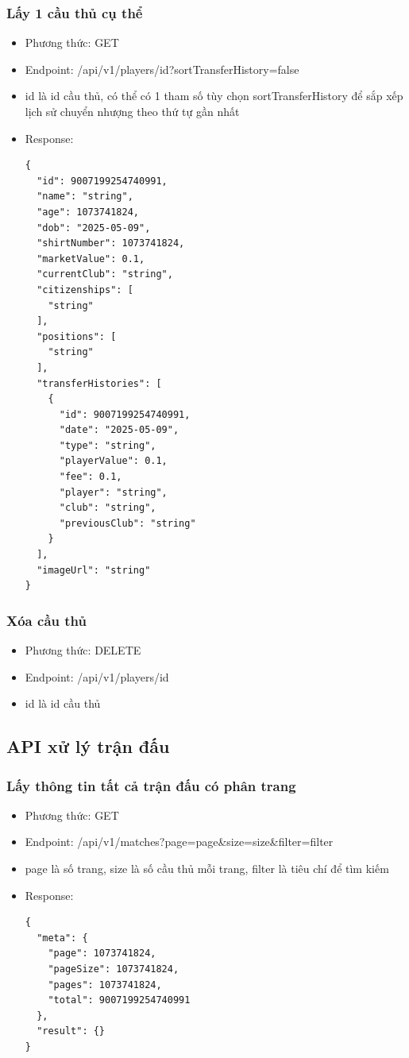\documentclass[../BTL.tex]{subfiles}
\begin{document}
\subsubsection{ Lấy 1 cầu thủ cụ thể}
\begin{itemize}
    \item Phương thức: GET
    \item Endpoint: /api/v1/players/{id}?sortTransferHistory=false
    \item {id} là id cầu thủ, có thể có 1 tham số tùy chọn sortTransferHistory để sắp xếp lịch sử chuyển nhượng theo thứ tự gần nhất
    \item Response:
        \begin{verbatim}          
{
  "id": 9007199254740991,
  "name": "string",
  "age": 1073741824,
  "dob": "2025-05-09",
  "shirtNumber": 1073741824,
  "marketValue": 0.1,
  "currentClub": "string",
  "citizenships": [
    "string"
  ],
  "positions": [
    "string"
  ],
  "transferHistories": [
    {
      "id": 9007199254740991,
      "date": "2025-05-09",
      "type": "string",
      "playerValue": 0.1,
      "fee": 0.1,
      "player": "string",
      "club": "string",
      "previousClub": "string"
    }
  ],
  "imageUrl": "string"
}
        \end{verbatim}
\end{itemize}
\subsubsection{ Xóa cầu thủ}
\begin{itemize}
    \item Phương thức: DELETE
    \item Endpoint: /api/v1/players/{id}
    \item {id} là id cầu thủ
\end{itemize}
\subsection{ API xử lý trận đấu}
\subsubsection{ Lấy thông tin tất cả trận đấu có phân trang}
\begin{itemize}
    \item Phương thức: GET
    \item Endpoint: /api/v1/matches?page={page}\&size={size}\&filter={filter}
    \item {page} là số trang, {size} là số cầu thủ mỗi trang, {filter} là tiêu chí để tìm kiếm
    \item Response:
        \begin{verbatim}          
{
  "meta": {
    "page": 1073741824,
    "pageSize": 1073741824,
    "pages": 1073741824,
    "total": 9007199254740991
  },
  "result": {}
}
        \end{verbatim}
\end{itemize}
\end{document}
